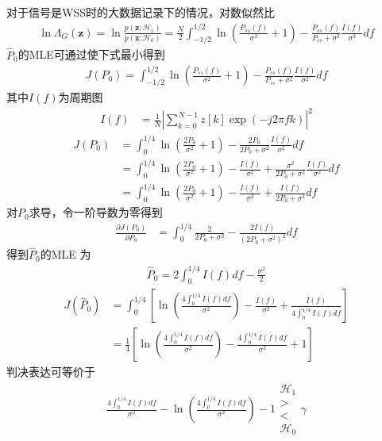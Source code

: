 \documentclass[fontset=windows]{article}
\numberwithin{figure}{section}
\begin{document}
对于信号是WSS时的大数据记录下的情况，对数似然比
\begin{align*}
	\ln \Lambda_G(\mathbf{z})=\ln \frac{p(\mathbf{z};\mathcal{H}_1)}{p(\mathbf{z};\mathcal{H}_0)}
	=\frac{N}{2}\int_{-1/2}^{1/2}\ln (\frac{P_{ss}(f)}{\sigma^2}+1)-\frac{P_{ss}(f)}{P_{ss}+\sigma^2}\frac{I(f)}{\sigma^2}df
\end{align*}
\(\hat{P}_0\)的MLE可通过使下式最小得到
\begin{align*}
	J(P_0)=\int_{-1/2}^{1/2}\ln (\frac{P_{ss}(f)}{\sigma^2}+1)-\frac{P_{ss}(f)}{P_{ss}+\sigma^2}\frac{I(f)}{\sigma^2}df
\end{align*}
其中\(I(f)\)为周期图
\begin{align*}
	I(f) & =\frac{1}{N}|\sum_{k=0}^{N-1}z[k]\exp(-j2\pi fk)|^2
\end{align*}
\begin{align*}
	J(P_0)
	 & =\int_{0}^{1/4}\ln (\frac{2P_0}{\sigma^2}+1)-\frac{2P_0}{2P_0+\sigma^2}\frac{I(f)}{\sigma^2}df                           \\
	 & =\int_{0}^{1/4}\ln (\frac{2P_0}{\sigma^2}+1)-\frac{I(f)}{\sigma^2}+\frac{\sigma^2}{2P_0+\sigma^2}\frac{I(f)}{\sigma^2}df \\
	 & =\int_{0}^{1/4}\ln (\frac{2P_0}{\sigma^2}+1)-\frac{I(f)}{\sigma^2}+\frac{I(f)}{2P_0+\sigma^2}df
\end{align*}
对\(P_0\)求导，令一阶导数为零得到
\begin{align*}
	\frac{\partial J(P_0)}{\partial P_0}
	 & =\int_{0}^{1/4}\frac{2}{2P_0+\sigma^2}-\frac{2I(f)}{(2P_0+\sigma^2)^2}df
\end{align*}
得到\(\hat{P}_0\)的MLE 为
\begin{align*}
	\hat{P}_0=2\int_{0}^{1/4}I(f)df-\frac{\sigma^2}{2}
\end{align*}
\begin{align*}
	J(\hat{P}_0)
	 & =\int_{0}^{1/4}\left[\ln(\frac{4\int_{0}^{1/4}I(f)df}{\sigma^2})-\frac{I(f)}{\sigma^2}+\frac{I(f)}{4\int_{0}^{1/4}I(f)df}\right] \\
	 & =\frac{1}{4}\left[\ln(\frac{4\int_{0}^{1/4}I(f)df}{\sigma^2})-\frac{4\int_{0}^{1/4}I(f)df}{\sigma^2}+1\right]
\end{align*}
判决表达可等价于
\begin{align*}
	\frac{4\int_{0}^{1/4}I(f)df}{\sigma^2}-\ln(\frac{4\int_{0}^{1/4}I(f)df}{\sigma^2})-1
	\begin{matrix}
		\mathcal{H}_1 \\>\\<\\\mathcal{H}_0
	\end{matrix} \gamma
\end{align*}
\end{document}
